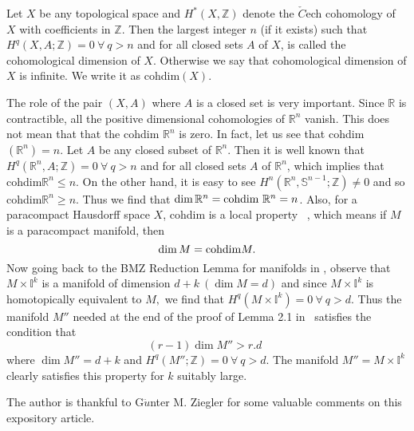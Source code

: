 \documentclass[11pt]{amsart}
\def\R{\mathbb R}
\def\Z{\mathbb Z}
\def\S{\mathbb S}
\def\I{\mathbb I}
\def\bn{\bigskip\noindent}
\begin{document}
{\Def Let $X$ be any topological space and $H^*(X,\Z)$ denote the $\check{C}$ech cohomology of $X$ with coefficients in $\Z$. Then the largest integer $n$ (if it exists) such that $H^q(X,A;\Z)=0~\forall~q>n$ and for all closed sets $A$ of $X$, is called the cohomological dimension of $X$. Otherwise we say that cohomological dimension of $X$ is infinite. We write it as cohdim$(X)$.}

\bn The role of the pair $(X,A)$ where $A$ is a closed set is very important. Since $\R$ is contractible, all the positive dimensional cohomologies of $\R^n$ vanish. This does not mean that that the cohdim $\R^n$ is zero. In fact, let us see that cohdim $(\R^n)=n.$  Let $A$ be any closed subset of $\R^n$. Then it is well known that $H^q(\R^n, A; \Z)= 0~\forall~q>n$ and for all closed sets $A$ of $\R^n$, which implies that cohdim$\R^n\leq n.$ On the other hand, it is easy to see $H^n(\R^n,\S^{n-1};\Z)\neq 0$ and so cohdim$\R^n\geq n.$ Thus we find that $\dim \R^n=\hbox{cohdim}~\R^n=n$. Also, for a paracompact Hausdorff space $X$, cohdim is a local property ~\cite{deo}, which means if $M$ is a paracompact manifold, then
$$\dim M=\hbox{cohdim} M. $$
Now going back to the BMZ Reduction Lemma for manifolds in \cite{bmz3}, observe that $M\times \I^k$ is a manifold of dimension $d+k ~(\dim M=d)$ and since $M\times \I^k$ is homotopically equivalent to $M,$ we find that $H^q(M\times\I^k)=0~\forall~q>d$. Thus the manifold $M''$ needed at the end of the proof of Lemma 2.1 in~\cite{bmz3} satisfies the condition that \begin{equation}(r-1)\dim M'' >r.d  ~~\tag{**} \end{equation} where $\dim M''=d+k$ and $H^q(M'';\Z)=0~\forall~q>d$. The manifold $M''= M\times\I^k$ clearly satisfies this property for $k$ suitably large.

The author is thankful to G$\ddot{u}$nter M. Ziegler for some valuable comments on this expository article.
\end{document}
